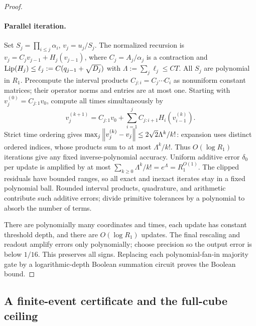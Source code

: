 \begin{proof}
\paragraph{Parallel iteration.}
Set $S_j=\prod_{i\le j}\alpha_i$, $v_j=u_j/S_j$. The normalized
recursion is $v_j=C_jv_{j-1}+H_j(v_{j-1})$, where
$C_j=A_j/\alpha_j$ is a contraction and
$\operatorname{Lip}(H_j)\le\ell_j:=C(q_{j-1}+\sqrt{D_j})$ with
$\Lambda:=\sum_j\ell_j\le CT$. All $S_j$ are polynomial in $R_1$.
Precompute the interval products $C_{j:i}=C_j\cdots C_i$ as
nonuniform constant matrices; their operator norms and entries are
at most one. Starting with $v_j^{(0)}=C_{j:1}v_0$, compute all times
simultaneously by
\[
 v_j^{(k+1)}=C_{j:1}v_0+
               \sum_{i=1}^j C_{j:i+1}H_i(v_{i-1}^{(k)}).
\]
Strict time ordering gives
$\max_j\left\lVert v_j^{(k)}-v_j\right\rVert\le2\sqrt2\Lambda^k/k!$:
expansion uses distinct ordered indices, whose products sum to at
most $\Lambda^k/k!$. Thus $O(\log R_1)$ iterations give any fixed
inverse-polynomial accuracy. Uniform additive error $\delta_0$ per
update is amplified by at most
$\sum_{k\ge0}\Lambda^k/k!=e^\Lambda=R_1^{O(1)}$.
The clipped residuals have bounded ranges, so all exact and inexact
iterates stay in a fixed polynomial ball. Rounded interval products,
quadrature, and arithmetic contribute such additive errors; divide
primitive tolerances by a polynomial to absorb the number of terms.

There are polynomially many coordinates and times, each update has
constant threshold depth, and there are $O(\log R_1)$ updates.
The final rescaling and readout amplify errors only polynomially;
choose precision so the output error is below $1/16$. This preserves
all signs. Replacing each polynomial-fan-in majority gate by a
logarithmic-depth Boolean summation circuit proves the Boolean bound.
\end{proof}

\subsection{A finite-event certificate and the full-cube ceiling}

